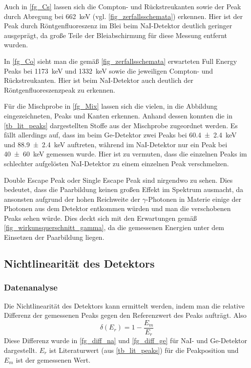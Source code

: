 \documentclass[
	a4paper,
	12pt,
	pagesize,
	ngerman
]{scrartcl}
\begin{document}
Auch in \cref{fg_Cs} lassen sich die Compton- und Rückstreukanten sowie der Peak durch Abregung bei \SI{662}{keV} (vgl. \cref{fig_zerfallsschemata}) erkennen.
Hier ist der Peak durch Röntgenfluoreszenz im Blei beim NaI-Detektor deutlich geringer ausgeprägt, da große Teile der Bleiabschirmung für diese Messung entfernt wurden.

In \cref{fg_Co} sieht man die gemäß \cref{fig_zerfallsschemata} erwarteten Full Energy Peaks bei \SI{1173}{keV} und \SI{1332}{keV} sowie die jeweiligen Compton- und Rückstreukanten.
Hier ist beim NaI-Detektor auch deutlich der Röntgenfluoreszenzpeak zu erkennen.

Für die Mischprobe in \cref{fg_Mix} lassen sich die vielen, in die Abbildung eingezeichneten, Peaks und Kanten erkennen.
Anhand dessen konnten die in \cref{tb_lit_peaks} dargestellten Stoffe aus der Mischprobe zugeordnet werden.
Es fällt allerdings auf, dass im beim Ge-Detektor zwei Peaks bei \SI{60.4\pm 2.4}{keV} und \SI{88.9\pm 2.4}{keV} auftreten, während im NaI-Detektor nur ein Peak bei \SI{40\pm 60}{keV} gemessen wurde.
Hier ist zu vermuten, dass die einzelnen Peaks im schlechter aufgelösten NaI-Detektor zu einem einzelnen Peak verschmelzen.

Double Escape Peak oder Single Escape Peak sind nirgendwo zu sehen.
Dies bedeutet, dass die Paarbildung keinen großen Effekt im Spektrum ausmacht, da ansonsten aufgrund der hohen Reichweite der $\gamma$-Photonen in Materie einige der Photonen aus dem Detektor entkommen würden und man die verschobenen Peaks sehen würde.
Dies deckt sich mit den Erwartungen gemäß \cref{fig_wirkunsquerschnitt_gamma}, da die gemessenen Energien unter dem Einsetzen der Paarbildung liegen.

\subsection{Nichtlinearität des Detektors}
\subsubsection{Datenanalyse}
Die Nichtlinearität des Detektors kann ermittelt werden, indem man die relative Differenz der gemessenen Peaks gegen den Referenzwert des Peaks aufträgt.
Also
\begin{equation}
	\delta(E_r) = 1- \frac{E_m}{E_r}
\end{equation}
Diese Differenz wurde  in \cref{fg_diff_na} und \cref{fg_diff_ge} für NaI- und Ge-Detektor dargestellt.
$E_r$ ist Literaturwert (aus \cref{tb_lit_peaks}) für die Peakposition und $E_m$ ist der gemessenen Wert.
\end{document}
